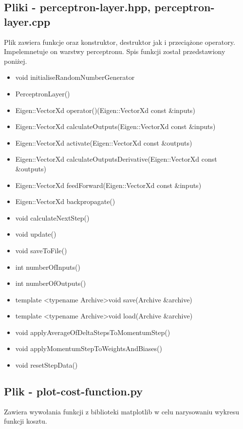 \documentclass{classrep}
\begin{document}
{        \subsection{Pliki - perceptron-layer.hpp, perceptron-layer.cpp}
        {
            Plik zawiera funkcje oraz konstruktor, destruktor jak i przeciążone operatory.
            Impelemnetuje on warstwy perceptronu.
            Spis funkcji został przedstawiony poniżej.
            \begin{itemize}
                \item void initialiseRandomNumberGenerator
                \item PerceptronLayer()
                \item Eigen::VectorXd operator()(Eigen::VectorXd const \&inputs)
                \item Eigen::VectorXd calculateOutputs(Eigen::VectorXd const \&inputs)
                \item Eigen::VectorXd activate(Eigen::VectorXd const \&outputs)
                \item Eigen::VectorXd calculateOutputsDerivative(Eigen::VectorXd const \&outputs)
                \item Eigen::VectorXd feedForward(Eigen::VectorXd const \&inputs)
                \item Eigen::VectorXd backpropagate()
                \item void calculateNextStep()
                \item void update()
                \item void saveToFile()
                \item int numberOfInputs()
                \item int numberOfOutputs()
                \item template <typename Archive>void save(Archive \&archive)
                \item template <typename Archive>void load(Archive \&archive)
                \item void applyAverageOfDeltaStepsToMomentumStep()
                \item void applyMomentumStepToWeightsAndBiases()
                \item void resetStepData()
            \end{itemize}
        }

        \subsection{Plik - plot-cost-function.py}
        {
            Zawiera wywołania funkcji z biblioteki matplotlib w celu narysowaniu
            wykresu funkcji kosztu.
        }

}
\end{document}
